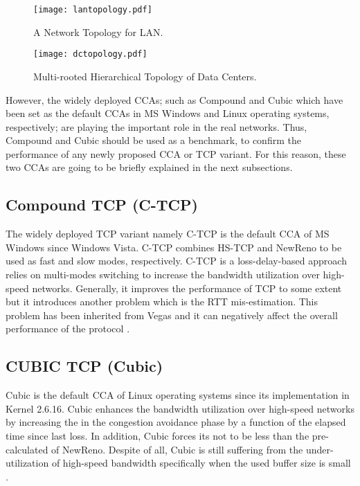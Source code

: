 \documentclass[preprint,3p,times,twocolumn,authoryear]{elsarticle}
\begin{document}
\begin{figure} [t]
\centering
\texttt{[image: lantopology.pdf]}
\caption{A Network Topology for LAN.}
\label{fig:lantopology}
\end{figure}

\begin{figure}[t]
\centering
\texttt{[image: dctopology.pdf]}
\caption{Multi-rooted Hierarchical Topology of Data Centers.}
\label{fig:dctopology}
\end{figure}

However, the widely deployed CCAs; such as Compound and Cubic which have been set as the default CCAs in MS Windows and Linux operating systems, respectively; are playing the important role in the real networks. Thus, Compound and Cubic should be used as a benchmark, to confirm the performance of any newly proposed CCA or TCP variant. For this reason, these two CCAs are going to be briefly explained in the next subsections.

\subsection{Compound TCP (C-TCP)}
The widely deployed TCP variant namely C-TCP \citep{Tan2006} is the default CCA of MS Windows since Windows Vista. C-TCP combines HS-TCP \citep{Floyd2003} and NewReno \citep{floyd1999} to be used as fast and slow modes, respectively. C-TCP is a loss-delay-based approach relies on multi-modes switching to increase the bandwidth utilization over high-speed networks. Generally, it improves the performance of TCP to some extent but it introduces another problem which is the RTT mis-estimation. This problem has been inherited from Vegas \citep{brak1995} and it can negatively affect the overall performance of the protocol \citep{Afanasyev2010, alrshah2014}.

\subsection{CUBIC TCP (Cubic)}
Cubic \citep{Ha2008} is the default CCA of Linux operating systems since its implementation in Kernel 2.6.16. Cubic enhances the bandwidth utilization over high-speed networks by increasing the  in the congestion avoidance phase by a  function of the elapsed time since last loss. In addition, Cubic forces its  not to be less than the pre-calculated  of NewReno. Despite of all, Cubic is still suffering from the under-utilization of high-speed bandwidth specifically when the used buffer size is small \citep{Afanasyev2010, alrshah2014, Ha2008}.
\end{document}
